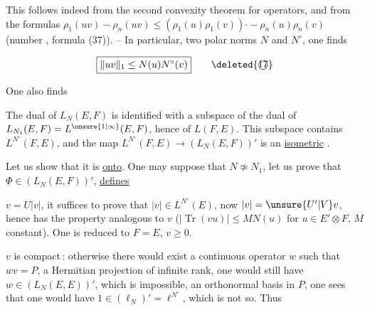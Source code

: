 
This follows indeed  from the second convexity theorem for operators, and from the formulas $\rho_1(uv){-}\rho_n(uv)\leq(\rho_1(u)\rho_1(v)){\cdot-}\rho_n(u)\rho_n(v)$ (number , formula (37)). -- In particular,    two polar norms $N$ and $N^\circ$, one finds



\[
\boxed{\lVert uv\rVert_1\leq N(u)N^\circ(v)}\tag*{\deleted{\textcircled{17}}}
\]

One also finds  

The dual of $L_N(E,F)$ is identified with a subspace of the dual of \uline{$L_{N_1}(E,F)=L^{\unsure{1|\infty}}(E,F)$}, hence of $L(F,E)$. \margin{\textcolor{red}{$\vert$}} This subspace contains $L^{N^\circ}(F,E)$, and the map $L^{N^\circ}(F,E)\to(L_N(E,F))'$ is an \uline{isometric} .

Let us show that it is \uline{onto}. One may suppose that $N\not\simeq N_1$, let us prove that   $\Phi\in(L_N(E,F))'$, \uline{defines}  

$v=U|v|$, it suffices to prove that $|v|\in L^{N^\circ}(E)$, now $|v|=\unsure{U'|V}v$, hence has the  property analogous to $v$ ($|\operatorname{Tr}(vu)|\leq M N(u)$ for $u\in E'\otimes F$, $M$ constant). One is reduced to $F=E$, $v\geq 0$.

$v$ is compact\,: otherwise there would exist a continuous operator $w$ such that  $wv=P$, a Hermitian projection of infinite rank,  one would still have $w\in(L_N(E,E))'$, which is impossible,   an orthonormal basis in $P$, one sees that one would have  $1\in(\ell_N)'=\ell^{N^\circ}$, which is not so. Thus

